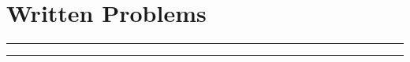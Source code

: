 \documentclass{article}
\begin{document}


\section*{Written Problems}
\noindent\rule{\textwidth}{1pt}\vspace{0.75mm}


\noindent\rule{\textwidth}{1pt}\vspace{0.75mm}

\end{document}
